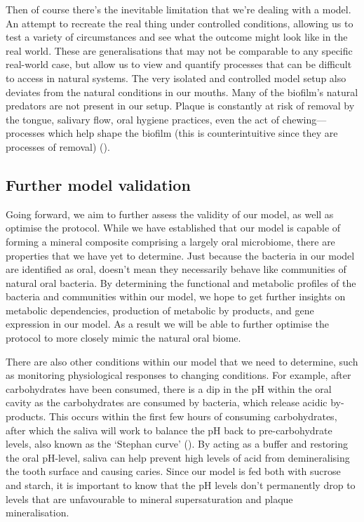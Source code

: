 \documentclass[
  b5paper,
]{book}
\begin{document}
Then of course there's the inevitable limitation that we're dealing with
a model. An attempt to recreate the real thing under controlled
conditions, allowing us to test a variety of circumstances and see what
the outcome might look like in the real world. These are generalisations
that may not be comparable to any specific real-world case, but allow us
to view and quantify processes that can be difficult to access in
natural systems. The very isolated and controlled model setup also
deviates from the natural conditions in our mouths. Many of the
biofilm's natural predators are not present in our setup. Plaque is
constantly at risk of removal by the tongue, salivary flow, oral hygiene
practices, even the act of chewing---processes which help shape the
biofilm (this is counterintuitive since they are processes of removal)
().

\subsection{Further model validation}\label{further-model-validation}

Going forward, we aim to further assess the validity of our model, as
well as optimise the protocol. While we have established that our model
is capable of forming a mineral composite comprising a largely oral
microbiome, there are properties that we have yet to determine. Just
because the bacteria in our model are identified as oral, doesn't mean
they necessarily behave like communities of natural oral bacteria. By
determining the functional and metabolic profiles of the bacteria and
communities within our model, we hope to get further insights on
metabolic dependencies, production of metabolic by products, and gene
expression in our model. As a result we will be able to further optimise
the protocol to more closely mimic the natural oral biome.

There are also other conditions within our model that we need to
determine, such as monitoring physiological responses to changing
conditions. For example, after carbohydrates have been consumed, there
is a dip in the pH within the oral cavity as the carbohydrates are
consumed by bacteria, which release acidic by-products. This occurs
within the first few hours of consuming carbohydrates, after which the
saliva will work to balance the pH back to pre-carbohydrate levels, also
known as the `Stephan curve'
(). By
acting as a buffer and restoring the oral pH-level, saliva can help
prevent high levels of acid from demineralising the tooth surface and
causing caries. Since our model is fed both with sucrose and starch, it
is important to know that the pH levels don't permanently drop to levels
that are unfavourable to mineral supersaturation and plaque
mineralisation.
\end{document}
